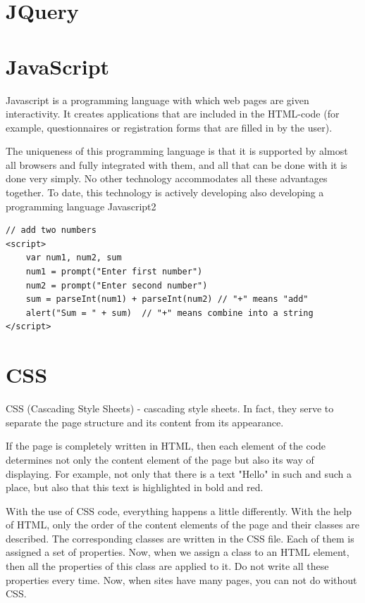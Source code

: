 \section{JQuery}

\section{JavaScript}
Javascript is a programming language with which web pages are given interactivity. It creates applications that are included in the HTML-code (for example, questionnaires or registration forms that are filled in by the user).\par The uniqueness of this programming language is that it is supported by almost all browsers and fully integrated with them, and all that can be done with it is done very simply. No other technology accommodates all these advantages together. To date, this technology is actively developing also developing a programming language Javascript2 \cite{JavaScript}

\begin{verbatim}
// add two numbers
<script>
    var num1, num2, sum
    num1 = prompt("Enter first number")
    num2 = prompt("Enter second number")
    sum = parseInt(num1) + parseInt(num2) // "+" means "add"
    alert("Sum = " + sum)  // "+" means combine into a string
</script>
\end{verbatim}
\cite{JavaScriptCode}

\section{CSS}
CSS (Cascading Style Sheets) - cascading style sheets. In fact, they serve to separate the page structure and its content from its appearance.\par If the page is completely written in HTML, then each element of the code determines not only the content element of the page but also its way of displaying. For example, not only that there is a text "Hello" in such and such a place, but also that this text is highlighted in bold and red.\par With the use of CSS code, everything happens a little differently. With the help of HTML, only the order of the content elements of the page and their classes are described. The corresponding classes are written in the CSS file. Each of them is assigned a set of properties. Now, when we assign a class to an HTML element, then all the properties of this class are applied to it. Do not write all these properties every time. Now, when sites have many pages, you can not do without CSS. \cite{CSS}


